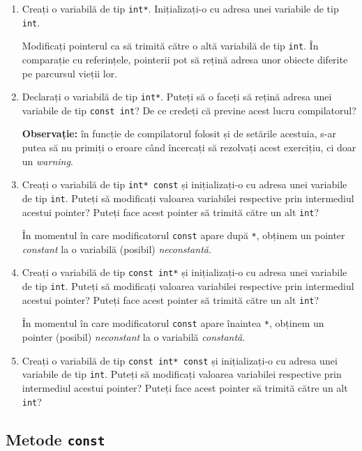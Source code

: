 \begin{enumerate}
    \item Creați o variabilă de tip \texttt{int*}. Inițializați-o cu adresa unei variabile de tip \texttt{int}.

    Modificați pointerul ca să trimită către o altă variabilă de tip \texttt{int}. În comparație cu referințele, pointerii pot să rețină adresa unor obiecte diferite pe parcursul vieții lor.

    \item Declarați o variabilă de tip \texttt{int*}. Puteți să o faceți să rețină adresa unei variabile de tip \texttt{const int}? De ce credeți că previne acest lucru compilatorul?

    \textbf{Observație:} în funcție de compilatorul folosit și de setările acestuia, s-ar putea să nu primiți o eroare când încercați să rezolvați acest exercițiu, ci doar un \textit{warning}.
    
    \item Creați o variabilă de tip \texttt{int* const} și inițializați-o cu adresa unei variabile de tip \texttt{int}. Puteți să modificați valoarea variabilei respective prin intermediul acestui pointer? Puteți face acest pointer să trimită către un alt \texttt{int}?

    În momentul în care modificatorul \texttt{const} apare după \texttt{*}, obținem un pointer \emph{constant} la o variabilă (posibil) \emph{neconstantă}.

    \item Creați o variabilă de tip \texttt{const int*} și inițializați-o cu adresa unei variabile de tip \texttt{int}. Puteți să modificați valoarea variabilei respective prin intermediul acestui pointer? Puteți face acest pointer să trimită către un alt \texttt{int}?
    
    În momentul în care modificatorul \texttt{const} apare înaintea \texttt{*}, obținem un pointer (posibil) \emph{neconstant} la o variabilă \emph{constantă}.

    \item Creați o variabilă de tip \texttt{const int* const} și inițializați-o cu adresa unei variabile de tip \texttt{int}. Puteți să modificați valoarea variabilei respective prin intermediul acestui pointer? Puteți face acest pointer să trimită către un alt \texttt{int}?
\end{enumerate}

\subsection*{Metode \texorpdfstring{\texttt{const}}{const}}

